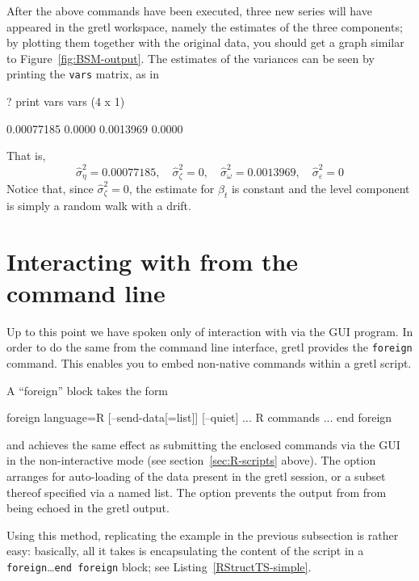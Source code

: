After the above commands have been executed, three new series will
have appeared in the gretl workspace, namely the estimates of
the three components; by plotting them together with the original
data, you should get a graph similar to
Figure~\ref{fig:BSM-output}. The estimates of the variances can be
seen by printing the \texttt{vars} matrix, as in

\begin{code}
? print vars
vars (4 x 1)

  0.00077185 
      0.0000 
   0.0013969 
      0.0000 
\end{code}

That is,
\begin{equation*}
  \hat{\sigma}^2_{\eta} = 0.00077185, \quad
  \hat{\sigma}^2_{\zeta} = 0, \quad
  \hat{\sigma}^2_{\omega} = 0.0013969, \quad
  \hat{\sigma}^2_{\varepsilon} = 0
\end{equation*}
Notice that, since $\hat{\sigma}^2_{\zeta} = 0$, the estimate for
$\beta_t$ is constant and the level component is simply a random walk
with a drift.

\section{Interacting with  from the command line}
\label{sec:foreign-command}

Up to this point we have spoken only of interaction with  via
the GUI program. In order to do the same from the command line
interface, gretl provides the \texttt{foreign} command. This
enables you to embed non-native commands within a gretl
script.

A ``foreign'' block takes the form
\begin{code}
foreign language=R [--send-data[=list]] [--quiet]
    ... R commands ...
end foreign
\end{code}
and achieves the same effect as submitting the enclosed 
commands via the GUI in the non-interactive mode (see
section~\ref{sec:R-scripts} above). The  option
arranges for auto-loading of the data present in the gretl session, or
a subset thereof specified via a named list.  The 
option prevents the output from  from being echoed in the gretl
output.

Using this method, replicating the example in the previous subsection
is rather easy: basically, all it takes is encapsulating the content
of the  script in a \texttt{foreign}\ldots\texttt{end foreign}
block; see Listing~\ref{RStructTS-simple}.

